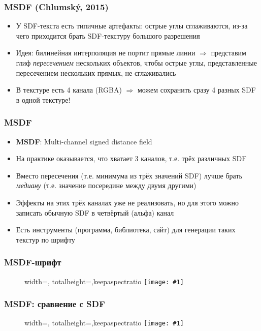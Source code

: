 \documentclass{beamer}
\newcommand{\slideimage}[1]{
  \begin{figure}
    \begin{adjustbox}{width=\textwidth, totalheight=\textheight-2\baselineskip-2\baselineskip,keepaspectratio}
      \texttt{[image: \#1]}
    \end{adjustbox}
  \end{figure}
}
\begin{document}
\begin{frame}[fragile]
\frametitle{MSDF (Chlumský, 2015)}
\begin{itemize}
\item У SDF-текста есть типичные артефакты: острые углы сглаживаются, из-за чего приходится брать SDF-текстуру большого разрешения
\pause
\item Идея: билинейная интерполяция не портит прямые линии \begin{math}\Longrightarrow\end{math} представим глиф \textit{пересечением} нескольких объектов, чтобы острые углы, представленные пересечением нескольких прямых, не сглаживались
\pause
\item В текстуре есть 4 канала (RGBA) \begin{math}\Longrightarrow\end{math} можем сохранить сразу 4 разных SDF в одной текстуре!
\end{itemize}
\end{frame}

\begin{frame}[fragile]
\frametitle{MSDF}
\begin{itemize}
\item \textbf{MSDF}: Multi-channel signed distance field
\pause
\item На практике оказывается, что хватает 3 каналов, т.е. трёх различных SDF
\pause
\item Вместо пересечения (т.е. минимума из трёх значений SDF) лучше брать \textit{медиану} (т.е. значение посередине между двумя другими)
\pause
\item Эффекты на этих трёх каналах уже не реализовать, но для этого можно записать обычную SDF в четвёртый (альфа) канал
\pause
\item Есть инструменты (программа, библиотека, сайт) для генерации таких текстур по шрифту
\end{itemize}
\end{frame}

\begin{frame}[fragile]
\frametitle{MSDF-шрифт}
\slideimage{msdf-font.png}
\end{frame}

\begin{frame}[fragile]
\frametitle{MSDF: сравнение с SDF}
\slideimage{msdf.png}
\end{frame}
\end{document}
